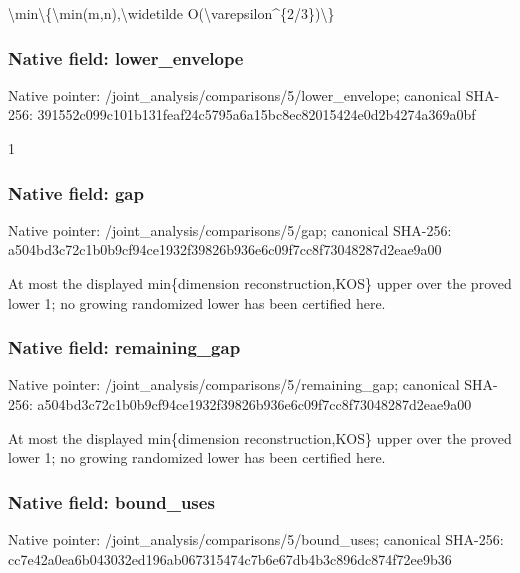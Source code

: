 \documentclass[10pt,a4paper]{article}
\begin{document}
\textbackslash{}min\textbackslash{}\{\textbackslash{}min(m,n),\textbackslash{}widetilde O(\textbackslash{}varepsilon\textasciicircum{}\{2/3\})\textbackslash{}\}


\subsubsection{Native field: lower\_envelope}


Native pointer: /joint\_analysis/comparis\allowbreak{}ons/5/lower\_envelope; canonical SHA-256: 391552c099c101b131feaf24\allowbreak{}c5795a6a15bc8ec82015424e\allowbreak{}0d2b4274a369a0bf


1


\subsubsection{Native field: gap}


Native pointer: /joint\_analysis/comparisons/5/gap; canonical SHA-256: a504bd3c72c1b0b9cf94ce19\allowbreak{}32f39826b936e6c09f7cc8f7\allowbreak{}3048287d2eae9a00


At most the displayed min\{dimension reconstruction,KOS\} upper over the proved lower 1; no growing randomized lower has been certified here.


\subsubsection{Native field: remaining\_gap}


Native pointer: /joint\_analysis/comparis\allowbreak{}ons/5/remaining\_gap; canonical SHA-256: a504bd3c72c1b0b9cf94ce19\allowbreak{}32f39826b936e6c09f7cc8f7\allowbreak{}3048287d2eae9a00


At most the displayed min\{dimension reconstruction,KOS\} upper over the proved lower 1; no growing randomized lower has been certified here.


\subsubsection{Native field: bound\_uses}


Native pointer: /joint\_analysis/comparis\allowbreak{}ons/5/bound\_uses; canonical SHA-256: cc7e42a0ea6b043032ed196a\allowbreak{}b067315474c7b6e67db4b3c8\allowbreak{}96dc874f72ee9b36
\end{document}
